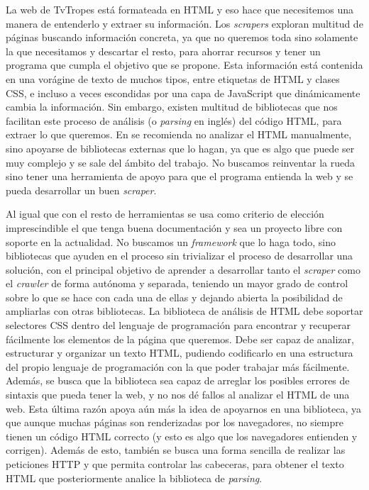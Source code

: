La web de TvTropes está formateada en HTML y eso hace que necesitemos una manera
de entenderlo y extraer su información. Los \textit{scrapers} exploran multitud
de páginas buscando información concreta, ya que no queremos toda sino solamente
la que necesitamos y descartar el resto, para ahorrar recursos y tener un
programa que cumpla el objetivo que se propone. Esta información está contenida
en una vorágine de texto de muchos tipos, entre etiquetas de HTML y clases CSS,
e incluso a veces escondidas por una capa de JavaScript que dinámicamente cambia
la información. Sin embargo, existen multitud de bibliotecas que nos facilitan
este proceso de análisis (o \textit{parsing} en inglés) del código HTML, para
extraer lo que queremos. En \cite{apress2018scraping} se recomienda no analizar
el HTML manualmente, sino apoyarse de bibliotecas externas que lo hagan, ya que
es algo que puede ser muy complejo y se sale del ámbito del trabajo. No buscamos
reinventar la rueda sino tener una herramienta de apoyo para que el programa
entienda la web y se pueda desarrollar un buen \textit{scraper}.

Al igual que con el resto de herramientas se usa como criterio de elección
imprescindible el que tenga buena documentación y sea un proyecto libre con
soporte en la actualidad. No buscamos un \textit{framework} que lo haga todo,
sino bibliotecas que ayuden en el proceso sin trivializar el proceso de
desarrollar una solución, con el principal objetivo de aprender a desarrollar
tanto el \textit{scraper} como el \textit{crawler} de forma autónoma y separada,
teniendo un mayor grado de control sobre lo que se hace con cada una de ellas y
dejando abierta la posibilidad de ampliarlas con otras bibliotecas. La
biblioteca de análisis de HTML debe soportar selectores CSS dentro del lenguaje
de programación para encontrar y recuperar fácilmente los elementos de la página
que queremos. Debe ser capaz de analizar, estructurar y organizar un texto HTML,
pudiendo codificarlo en una estructura del propio lenguaje de programación con
la que poder trabajar más fácilmente. Además, se busca que la biblioteca sea
capaz de arreglar los posibles errores de sintaxis que pueda tener la web, y no
nos dé fallos al analizar el HTML de una web. Esta última razón apoya aún más la
idea de apoyarnos en una biblioteca, ya que aunque muchas páginas son
renderizadas por los navegadores, no siempre tienen un código HTML correcto (y
esto es algo que los navegadores entienden y corrigen). Además de esto, también
se busca una forma sencilla de realizar las peticiones HTTP y que permita
controlar las cabeceras, para obtener el texto HTML que posteriormente analice
la biblioteca de \textit{parsing}.

